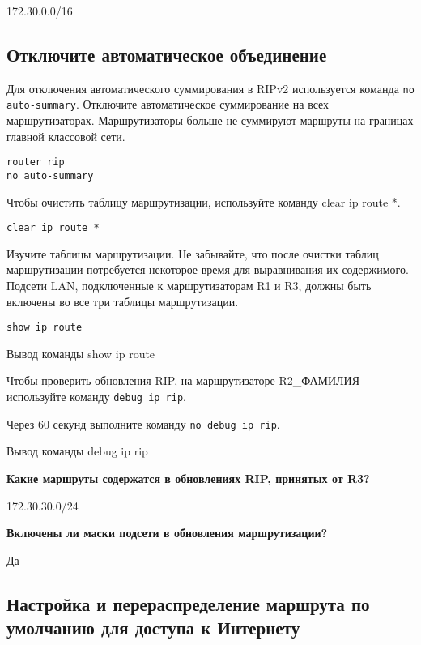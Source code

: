 172.30.0.0/16

\subsection{Отключите автоматическое объединение}

Для отключения автоматического суммирования
в RIPv2 используется команда \texttt{no auto-summary}.
Отключите автоматическое суммирование на всех маршрутизаторах.
Маршрутизаторы больше не суммируют маршруты на границах главной
классовой сети.

\begin{verbatim}
router rip
no auto-summary
\end{verbatim}

Чтобы очистить таблицу маршрутизации, используйте команду clear ip route *.

\begin{verbatim}
clear ip route *
\end{verbatim}

Изучите таблицы маршрутизации. Не забывайте, что после очистки таблиц
маршрутизации потребуется некоторое время для выравнивания их содержимого.
Подсети LAN, подключенные к маршрутизаторам R1 и R3,
должны быть включены во все три таблицы маршрутизации.

\begin{verbatim}
show ip route
\end{verbatim}

\begin{image}
    \caption{Вывод команды show ip route}
\end{image}

Чтобы проверить обновления RIP, на маршрутизаторе
R2\_ФАМИЛИЯ используйте команду \texttt{debug ip rip}.

Через 60 секунд выполните команду \texttt{no debug ip rip}.

\begin{image}
    \caption{Вывод команды debug ip rip}
\end{image}

\textbf{Какие маршруты содержатся в обновлениях RIP, принятых от R3?}

172.30.30.0/24

\textbf{Включены ли маски подсети в обновления маршрутизации?}

Да

\subsection{Настройка и перераспределение маршрута
по умолчанию для доступа к Интернету}

